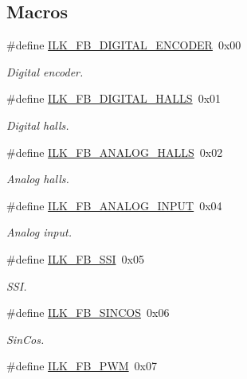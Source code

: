 \subsection*{Macros}
\begin{DoxyCompactItemize}
\item 
\#define \hyperlink{group__IL__CONST__FB_gae3ff92eb789c2fec9b7a629b20418af1}{I\+L\+K\+\_\+\+F\+B\+\_\+\+D\+I\+G\+I\+T\+A\+L\+\_\+\+E\+N\+C\+O\+D\+ER}~0x00
\begin{DoxyCompactList}\small\item\em Digital encoder. \end{DoxyCompactList}\item 
\#define \hyperlink{group__IL__CONST__FB_ga624f38df3393c8c74ca8f350f1acfb7b}{I\+L\+K\+\_\+\+F\+B\+\_\+\+D\+I\+G\+I\+T\+A\+L\+\_\+\+H\+A\+L\+LS}~0x01
\begin{DoxyCompactList}\small\item\em Digital halls. \end{DoxyCompactList}\item 
\#define \hyperlink{group__IL__CONST__FB_gada00d2cfc8c349a4976600232b399a2c}{I\+L\+K\+\_\+\+F\+B\+\_\+\+A\+N\+A\+L\+O\+G\+\_\+\+H\+A\+L\+LS}~0x02
\begin{DoxyCompactList}\small\item\em Analog halls. \end{DoxyCompactList}\item 
\#define \hyperlink{group__IL__CONST__FB_ga03d870b0c6512ec965806036c6878ebb}{I\+L\+K\+\_\+\+F\+B\+\_\+\+A\+N\+A\+L\+O\+G\+\_\+\+I\+N\+P\+UT}~0x04
\begin{DoxyCompactList}\small\item\em Analog input. \end{DoxyCompactList}\item 
\#define \hyperlink{group__IL__CONST__FB_ga9874ed60d637b9bf51850678add98685}{I\+L\+K\+\_\+\+F\+B\+\_\+\+S\+SI}~0x05
\begin{DoxyCompactList}\small\item\em S\+SI. \end{DoxyCompactList}\item 
\#define \hyperlink{group__IL__CONST__FB_ga06e050308174827bf2f5de8c1fb18340}{I\+L\+K\+\_\+\+F\+B\+\_\+\+S\+I\+N\+C\+OS}~0x06
\begin{DoxyCompactList}\small\item\em Sin\+Cos. \end{DoxyCompactList}\item 
\#define \hyperlink{group__IL__CONST__FB_ga43f62e2c2cc014a82a93c76a11ad8106}{I\+L\+K\+\_\+\+F\+B\+\_\+\+P\+WM}~0x07

\end{DoxyCompactItemize}
